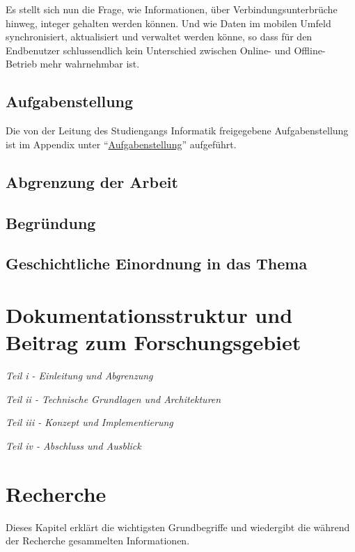 \documentclass[oneside,11pt,parskip=half,ngerman]{scrreprt}
\begin{document}
Es stellt sich nun die Frage, wie Informationen, über
Verbindungsunterbrüche hinweg, integer gehalten werden können. Und wie
Daten im mobilen Umfeld synchronisiert, aktualisiert und verwaltet
werden könne, so dass für den Endbenutzer schlussendlich kein
Unterschied zwischen Online- und Offline-Betrieb mehr wahrnehmbar ist.

\section{Aufgabenstellung}\label{aufgabenstellung}

Die von der Leitung des Studiengangs Informatik freigegebene
Aufgabenstellung ist im Appendix unter
\enquote{\hyperref[appendixux5faufgabenstellung]{Aufgabenstellung}}
aufgeführt.

\section{Abgrenzung der Arbeit}\label{abgrenzung-der-arbeit}

\section{Begründung}\label{begruxfcndung}

\section{Geschichtliche Einordnung in das
Thema}\label{geschichtliche-einordnung-in-das-thema}

\chapter{Dokumentationsstruktur und Beitrag zum
Forschungsgebiet}\label{dokumentationsstruktur-und-beitrag-zum-forschungsgebiet}

\emph{Teil i - Einleitung und Abgrenzung}

\emph{Teil ii - Technische Grundlagen und Architekturen}

\emph{Teil iii - Konzept und Implementierung}

\emph{Teil iv - Abschluss und Ausblick}

\chapter{Recherche}\label{recherche}

Dieses Kapitel erklärt die wichtigsten Grundbegriffe und wiedergibt die
während der Recherche gesammelten Informationen.
\end{document}
